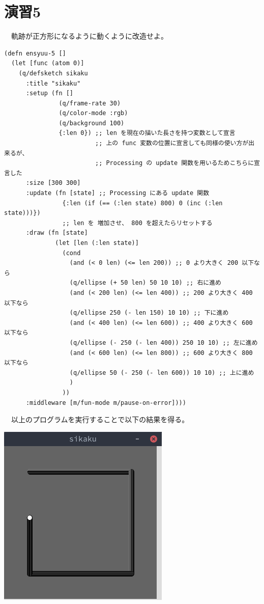 \documentclass{scrartcl}
\begin{document}
\section{演習5}
\label{sec:orgb293517}
　軌跡が正方形になるように動くように改造せよ。\\
\begin{verbatim}
(defn ensyuu-5 []
  (let [func (atom 0)]
    (q/defsketch sikaku
      :title "sikaku"
      :setup (fn []
               (q/frame-rate 30)
               (q/color-mode :rgb)
               (q/background 100)
               {:len 0}) ;; len を現在の描いた長さを持つ変数として宣言
                         ;; 上の func 変数の位置に宣言しても同様の使い方が出来るが、
                         ;; Processing の update 関数を用いるためこちらに宣言した
      :size [300 300]
      :update (fn [state] ;; Processing にある update 関数
                {:len (if (== (:len state) 800) 0 (inc (:len state)))}) 
                ;; len を 増加させ、 800 を超えたらリセットする
      :draw (fn [state]
              (let [len (:len state)]
                (cond
                  (and (< 0 len) (<= len 200)) ;; 0 より大きく 200 以下なら
                  (q/ellipse (+ 50 len) 50 10 10) ;; 右に進め
                  (and (< 200 len) (<= len 400)) ;; 200 より大きく 400 以下なら
                  (q/ellipse 250 (- len 150) 10 10) ;; 下に進め
                  (and (< 400 len) (<= len 600)) ;; 400 より大きく 600 以下なら
                  (q/ellipse (- 250 (- len 400)) 250 10 10) ;; 左に進め
                  (and (< 600 len) (<= len 800)) ;; 600 より大きく 800 以下なら
                  (q/ellipse 50 (- 250 (- len 600)) 10 10) ;; 上に進め
                  )
                ))
      :middleware [m/fun-mode m/pause-on-error])))
\end{verbatim}
　以上のプログラムを実行することで以下の結果を得る。\\
\begin{center}
\includegraphics[width=0.3\linewidth]{./img/ensyuu5.png}
\end{center}
\end{document}
